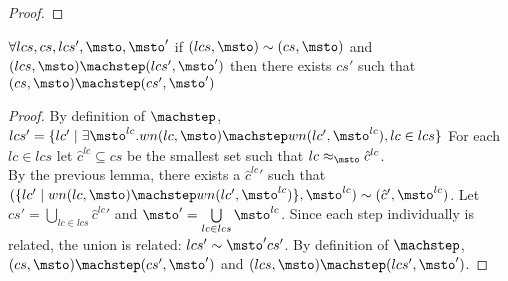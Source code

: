 \begin{proof}
\end{proof}


\begin{theorem}
$\forall lcs,cs,lcs',\msto,\msto'$ if $\capprx{(lcs, \msto)}{(cs,\msto)}$
  and $(lcs,\msto) \machstep (lcs',\msto')$ then there exists $cs'$
  such that $(cs,\msto) \machstep (cs',\msto')$
\end{theorem}
\begin{proof}
By definition of $\machstep$,
$lcs' = \{lc' \mid \exists \msto^{lc}. wn(lc,\msto) \machstep wn(lc', \msto^{lc}), lc \in lcs\}$
For each $lc \in lcs$ let $\hat{c}^{lc} \subseteq cs$ be the
smallest set such that $\lapprx{lc}{\msto}{\hat{c}^{lc}}$. \\ By the
previous lemma, there exists a $\hat{c}^{lc}{}'$ such that $\capprx{(\{lc' \mid wn(lc,\msto) \machstep
  wn(lc', \msto^{lc})\}, \msto^{lc})}{(\hat{c}',\msto^{lc})}$. Let
$cs' = \bigcup\limits_{lc \in lcs}{\hat{c}^{lc}{}'}$ and $\msto' = \bigcup\limits_{lc \in lcs}{\msto^{lc}}$.
Since each step individually is related, the union is related: $\capprx{lcs'}{\msto'}{cs'}$.
By definition of $\machstep$, $(cs, \msto) \machstep (cs', \msto')$ and $(lcs, \msto) \machstep (lcs', \msto')$.
\end{proof}

